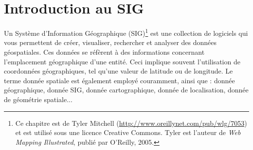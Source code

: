 \section{Introduction au SIG}\label{label_intro} 


Un Syst\`eme d'Information G\'eographique (SIG)\cite{mitchel05}\footnote{Ce chapitre est de Tyler Mitchell (\url{http://www.oreillynet.com/pub/wlg/7053}) et est utilis\'e sous une licence Creative Commons. Tyler est l'auteur de \textit{Web Mapping Illustrated}, publi\'e par O'Reilly, 2005.} est une collection de logiciels qui vous permettent de cr\'eer, visualiser, rechercher et analyser des donn\'ees g\'eospatiales. Ces donn\'ees se r\'ef\`erent \`a des informations concernant l'emplacement g\'eographique d'une entit\'e. Ceci implique souvent l'utilisation de coordonn\'ees g\'eographiques, tel qu'une valeur de latitude ou de longitude. Le terme donn\'ee spatiale est \'egalement employ\'e couramment, ainsi que : donn\'ee g\'eographique, donn\'ee SIG, donn\'ee cartographique, donn\'ee de localisation, donn\'ee de g\'eom\'etrie spatiale...


